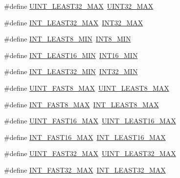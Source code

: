 \begin{DoxyCompactItemize}
\#define \hyperlink{orstdint_8h_a70cad8bacc9a6db301e1cdc86cc8d571}{U\-I\-N\-T\-\_\-\-L\-E\-A\-S\-T32\-\_\-\-M\-A\-X}~\hyperlink{stdint_8h_ab5eb23180f7cc12b7d6c04a8ec067fdd}{U\-I\-N\-T32\-\_\-\-M\-A\-X}
\item 
\#define \hyperlink{orstdint_8h_a5618711a0a54f722190a3a1219e278c2}{I\-N\-T\-\_\-\-L\-E\-A\-S\-T32\-\_\-\-M\-A\-X}~\hyperlink{stdint_8h_a181807730d4a375f848ba139813ce04f}{I\-N\-T32\-\_\-\-M\-A\-X}
\item 
\#define \hyperlink{orstdint_8h_a3e986cad833f63f420962ff60eda87e5}{I\-N\-T\-\_\-\-L\-E\-A\-S\-T8\-\_\-\-M\-I\-N}~\hyperlink{stdint_8h_aadcf2a81af243df333b31efa6461ab8e}{I\-N\-T8\-\_\-\-M\-I\-N}
\item 
\#define \hyperlink{orstdint_8h_a1f91bfd5820c2f27af3d260fc75813e1}{I\-N\-T\-\_\-\-L\-E\-A\-S\-T16\-\_\-\-M\-I\-N}~\hyperlink{stdint_8h_ad4e9955955b27624963643eac448118a}{I\-N\-T16\-\_\-\-M\-I\-N}
\item 
\#define \hyperlink{orstdint_8h_a2360a536116dd734820a6b5b3d560ce7}{I\-N\-T\-\_\-\-L\-E\-A\-S\-T32\-\_\-\-M\-I\-N}~\hyperlink{stdint_8h_a688eb21a22db27c2b2bd5836943cdcbe}{I\-N\-T32\-\_\-\-M\-I\-N}
\item 
\#define \hyperlink{orstdint_8h_a2c6f97ea2d76d0cf6260c84046cdb44e}{U\-I\-N\-T\-\_\-\-F\-A\-S\-T8\-\_\-\-M\-A\-X}~\hyperlink{stdint_8h_a2a80bde77ee1698d0f42f334adad4f2b}{U\-I\-N\-T\-\_\-\-L\-E\-A\-S\-T8\-\_\-\-M\-A\-X}
\item 
\#define \hyperlink{orstdint_8h_acbcdb3bee0f5f904da5df8de69a80ca3}{I\-N\-T\-\_\-\-F\-A\-S\-T8\-\_\-\-M\-A\-X}~\hyperlink{stdint_8h_aa05109908fb2770f632d2b646b9f85bf}{I\-N\-T\-\_\-\-L\-E\-A\-S\-T8\-\_\-\-M\-A\-X}
\item 
\#define \hyperlink{orstdint_8h_aed28ca63d9b222f6f1377358fe73a183}{U\-I\-N\-T\-\_\-\-F\-A\-S\-T16\-\_\-\-M\-A\-X}~\hyperlink{stdint_8h_a6ef6a1a518bbf516ca8b0180b11c358f}{U\-I\-N\-T\-\_\-\-L\-E\-A\-S\-T16\-\_\-\-M\-A\-X}
\item 
\#define \hyperlink{orstdint_8h_a2fd35d0ea091e04caec504ff0042cf00}{I\-N\-T\-\_\-\-F\-A\-S\-T16\-\_\-\-M\-A\-X}~\hyperlink{stdint_8h_a7eb2a8e2a1c65d6c9ad0f86154890baa}{I\-N\-T\-\_\-\-L\-E\-A\-S\-T16\-\_\-\-M\-A\-X}
\item 
\#define \hyperlink{orstdint_8h_ad51246a178143208b2db3315efd21c45}{U\-I\-N\-T\-\_\-\-F\-A\-S\-T32\-\_\-\-M\-A\-X}~\hyperlink{stdint_8h_a70cad8bacc9a6db301e1cdc86cc8d571}{U\-I\-N\-T\-\_\-\-L\-E\-A\-S\-T32\-\_\-\-M\-A\-X}
\item 
\#define \hyperlink{orstdint_8h_ac96fa0f41b19e89f109e4f9913ca6635}{I\-N\-T\-\_\-\-F\-A\-S\-T32\-\_\-\-M\-A\-X}~\hyperlink{stdint_8h_a5618711a0a54f722190a3a1219e278c2}{I\-N\-T\-\_\-\-L\-E\-A\-S\-T32\-\_\-\-M\-A\-X}

\end{DoxyCompactItemize}
